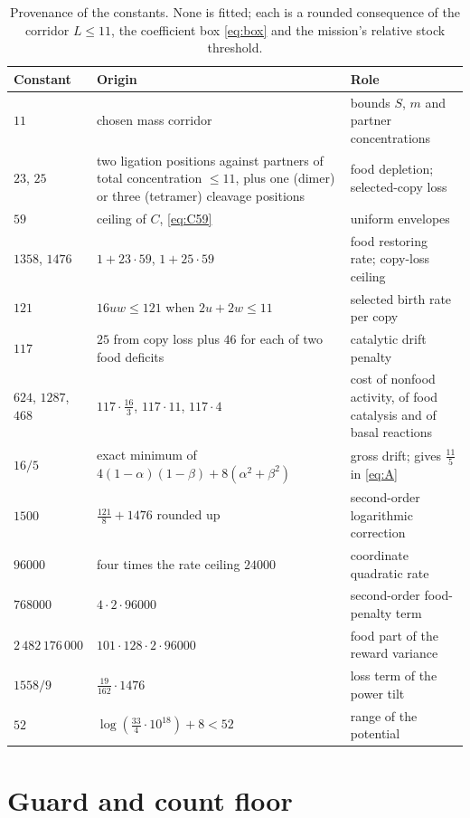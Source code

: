 \documentclass[11pt,letterpaper]{article}
\theoremstyle{plain}
\theoremstyle{definition}
\theoremstyle{remark}
\numberwithin{equation}{section}
\begin{document}
\begin{table}[t]
\centering\small
\begin{tabular}{@{}l>{\raggedright\arraybackslash}p{.5\linewidth}>{\raggedright\arraybackslash}p{.3\linewidth}@{}}
\toprule
Constant & Origin & Role\\
\midrule
$11$ & chosen mass corridor & bounds $S$, $m$ and partner concentrations\\
$23$, $25$ & two ligation positions against partners of total concentration $\le11$, plus one (dimer) or three (tetramer) cleavage positions & food depletion; selected-copy loss\\
$59$ & ceiling of $C$, \eqref{eq:C59} & uniform envelopes\\
$1358$, $1476$ & $1+23\cdot59$, $1+25\cdot59$ & food restoring rate; copy-loss ceiling\\
$121$ & $16uw\le121$ when $2u+2w\le11$ & selected birth rate per copy\\
$117$ & $25$ from copy loss plus $46$ for each of two food deficits & catalytic drift penalty\\
$624$, $1287$, $468$ & $117\cdot\tfrac{16}3$, $117\cdot11$, $117\cdot4$ & cost of nonfood activity, of food catalysis and of basal reactions\\
$16/5$ & exact minimum of $4(1-\alpha)(1-\beta)+8(\alpha^2+\beta^2)$ & gross drift; gives $\tfrac{11}5$ in \eqref{eq:A}\\
$1500$ & $\tfrac{121}8+1476$ rounded up & second-order logarithmic correction\\
$96000$ & four times the rate ceiling $24000$ & coordinate quadratic rate\\
$768000$ & $4\cdot2\cdot96000$ & second-order food-penalty term\\
$2\,482\,176\,000$ & $101\cdot128\cdot2\cdot96000$ & food part of the reward variance\\
$1558/9$ & $\tfrac{19}{162}\cdot1476$ & loss term of the power tilt\\
$52$ & $\log(\tfrac{33}4\cdot10^{18})+8<52$ & range of the potential\\
\bottomrule
\end{tabular}
\caption{Provenance of the constants. None is fitted; each is a rounded consequence of the corridor $L\le11$, the coefficient box \eqref{eq:box} and the mission's relative stock threshold.}
\label{tab:constants}
\end{table}

\section{Guard and count floor}\label{sec:floor}
\end{document}
